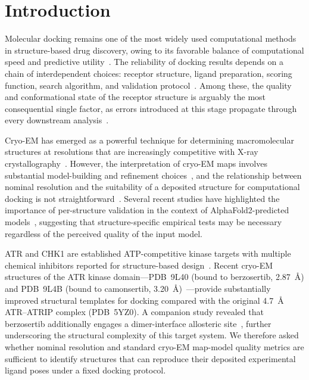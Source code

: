 \documentclass[global,twocolumn]{svjour}
\begin{document}

\section{Introduction}

Molecular docking remains one of the most widely used computational methods
in structure-based drug discovery, owing to its favorable balance of
computational speed and predictive utility~\cite{trott2010,hartshorn2007}.
The reliability of docking results depends on a chain of interdependent
choices: receptor structure, ligand preparation, scoring function, search
algorithm, and validation protocol~\cite{chen2019,coley2021}. Among these,
the quality and conformational state of the receptor structure is arguably
the most consequential single factor, as errors introduced at this stage
propagate through every downstream analysis~\cite{schneider2017,warren2006}.

Cryo-EM has emerged as a powerful technique for determining macromolecular
structures at resolutions that are increasingly competitive with X-ray
crystallography~\cite{pintilie2020,kuhlbrandt2014}. However, the
interpretation of cryo-EM maps involves substantial model-building and
refinement choices~\cite{terwilliger2024,croll2021}, and the relationship
between nominal resolution and the suitability of a deposited structure for
computational docking is not straightforward~\cite{cerveira2023}. Several
recent studies have highlighted the importance of per-structure validation
in the context of AlphaFold2-predicted models~\cite{wong2024,scott2022},
suggesting that structure-specific empirical tests may be necessary
regardless of the perceived quality of the input model.

ATR and CHK1 are established ATP-competitive kinase targets with multiple
chemical inhibitors reported for structure-based
design~\cite{kumagai2006,bass2016,saldivar2017,casper2002,debatisse2012,fokas2012}.
Recent cryo-EM structures of the ATR kinase domain---PDB~9L40 (bound to
berzosertib, 2.87~\AA{}) and PDB~9L4B (bound to camonsertib,
3.20~\AA{})~\cite{wang2025}---provide substantially improved structural
templates for docking compared with the original 4.7~\AA{} ATR--ATRIP complex
(PDB~5YZ0). A companion study revealed that berzosertib additionally engages
a dimer-interface allosteric site~\cite{wang2025}, further underscoring the
structural complexity of this target system. We therefore asked whether
nominal resolution and standard cryo-EM map-model quality metrics are
sufficient to identify structures that can reproduce their deposited
experimental ligand poses under a fixed docking protocol.
\end{document}
